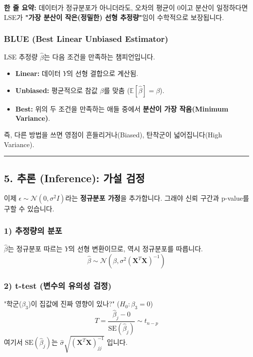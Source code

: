 \documentclass[11pt,a4paper]{book}
\theoremstyle{definition}
\begin{document}
\begin{conceptbox}[title={개념 4: 왜 하필 LSE인가?}]
\textbf{한 줄 요약:} 데이터가 정규분포가 아니더라도, 오차의 평균이 0이고 분산이 일정하다면 LSE가 \textbf{"가장 분산이 작은(정밀한) 선형 추정량"}임이 수학적으로 보장됩니다.
\end{conceptbox}

\subsubsection*{BLUE (Best Linear Unbiased Estimator)}
LSE 추정량 $\hat{\beta}$는 다음 조건을 만족하는 챔피언입니다.
\begin{itemize}
    \item \textbf{Linear:} 데이터 $Y$의 선형 결합으로 계산됨.
    \item \textbf{Unbiased:} 평균적으로 참값 $\beta$를 맞춤 ($\mathbb{E}[\hat{\beta}] = \beta$).
    \item \textbf{Best:} 위의 두 조건을 만족하는 애들 중에서 \textbf{분산이 가장 작음(Minimum Variance)}.
\end{itemize}
즉, 다른 방법을 쓰면 영점이 흔들리거나(Biased), 탄착군이 넓어집니다(High Variance).

\vspace{0.5cm}\hrule\vspace{0.5cm}

\subsection{5. 추론 (Inference): 가설 검정}

이제 $\epsilon \sim \mathcal{N}(0, \sigma^2 I)$라는 \textbf{정규분포 가정}을 추가합니다. 그래야 신뢰 구간과 p-value를 구할 수 있습니다.

\subsubsection*{1) 추정량의 분포}
$\hat{\beta}$는 정규분포 따르는 $Y$의 선형 변환이므로, 역시 정규분포를 따릅니다.
$$ \hat{\beta} \sim \mathcal{N}\left(\beta, \sigma^2 (\mathbf{X}^T \mathbf{X})^{-1}\right) $$

\subsubsection*{2) t-test (변수의 유의성 검정)}
"학군($\beta_3$)이 집값에 진짜 영향이 있나?" ($H_0: \beta_3 = 0$)
$$ T = \frac{\hat{\beta}_j - 0}{\text{SE}(\hat{\beta}_j)} \sim t_{n-p} $$
여기서 $\text{SE}(\hat{\beta}_j)$는 $\hat{\sigma} \sqrt{(\mathbf{X}^T \mathbf{X})^{-1}_{jj}}$ 입니다.
\end{document}
